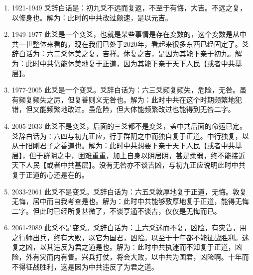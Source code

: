 \documentclass[12pt,oneside]{book}
\begin{document}
\begin{enumerate}
\item 1921-1949 爻辞白话是：初九爻不远而复返，不至于有悔，大吉。不远之复，以修身也。解为：此时的中共改过颇速，是以元吉。

\item 1949-1977 此爻是一个变爻，也就是某些事情是存在变数的，这个变数是从中共一世整体来看的，现在我们已处于2020年，看起来很多东西已经固定了。爻辞白话为：六二爻休美之复，吉祥。休复之吉，是因为其能下亲于初九。解为：此时中共仍能休美地复于正道，因为其能下亲于天下人民【或者中共基层】。

\item 1977-2005 此爻是一个变爻。爻辞白话为：六三爻频复频失，危险，无咎。虽有频复频失之厉，但复善则义无咎也。解为：此时中共在这个时期频繁地犯错，但又能频繁地改过。虽危险，但大体能频繁改过也能得到无咎二字。

\item 2005-2033 此爻不是变爻，后面的三爻都不是变爻，盖中共后面的命运已定。爻辞白话为：六四与初九正应，行于群阴之中而独自复于正道。中行独复，以从于阳刚君子之善道也。解为：此时中共想要下亲于天下人民【或者中共基层】，但于群阴之中，困难重重，加上自身以阴居阴，甚是柔弱，终不能接近天下人民【或者中共基层】。没有无咎亦不谈吉凶，与初九正应说明此时中共复于正道的心还是在的。

\item 2033-2061 此爻不是变爻。爻辞白话为：六五爻敦厚地复于正道，无悔。敦复无悔，居中而自我考查是也。解为：此时中共能够敦厚地复于正道，能得无悔二字。但此时已经所复甚微了，不谈亨通不谈吉，仅仅是无悔而已。

\item 2061-2089 此爻不是变爻。爻辞白话为：上六爻迷而不复，凶险，有灾眚，用之行师出兵，终有大败，以它为国君，凶险。以至于十年都不能征战胜利。迷复之凶，以其违反为君之道是也。解为：此时中共执迷而不知复于正道，凶险，外有灾而内有眚。兴兵打仗，将会大败，以中共为国君，凶险啊。十年而不得征战胜利，这是因为中共违反了为君之道。

\end{enumerate}
\end{document}
